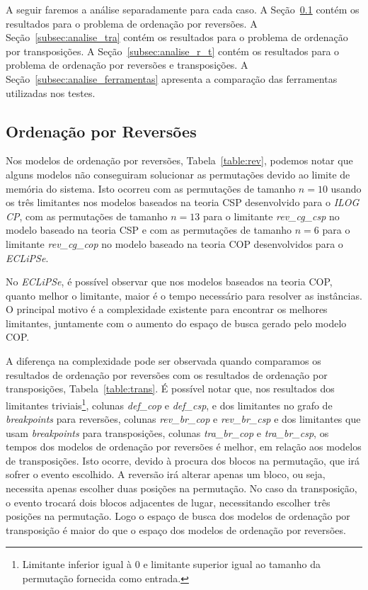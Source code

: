 A seguir faremos a análise separadamente para cada caso. A
Seção~\ref{subsec:analise_rev} contém os resultados para o problema de
ordenação por reversões. A Seção~\ref{subsec:analise_tra} contém os
resultados para o problema de ordenação por transposições. A
Seção~\ref{subsec:analise_r_t} contém os resultados para o problema de
ordenação por reversões e transposições. A
Seção~\ref{subsec:analise_ferramentas} apresenta a comparação das
ferramentas utilizadas nos testes.

\subsection{Ordenação por Reversões}
\label{subsec:analise_rev}
Nos modelos de ordenação por reversões, Tabela~\ref{table:rev}, podemos
notar que alguns modelos não conseguiram solucionar as permutações
devido ao limite de memória do sistema. Isto ocorreu com as permutações
de tamanho $n = 10$ usando os três limitantes nos modelos baseados na
teoria CSP desenvolvido para o \textit{ILOG CP}, com as permutações de
tamanho $n = 13$ para o limitante \textit{rev\_cg\_csp} no modelo
baseado na teoria CSP e com as permutações de tamanho $n = 6$ para o
limitante \textit{rev\_cg\_cop} no modelo baseado na teoria COP
desenvolvidos para o \textit{ECLiPSe}.

No \textit{ECLiPSe}, é possível observar que nos modelos baseados na
teoria COP, quanto melhor o limitante, maior é o tempo necessário para
resolver as instâncias. O principal motivo é a complexidade existente
para encontrar os melhores limitantes, juntamente com o aumento do
espaço de busca gerado pelo modelo COP. 

A diferença na complexidade pode ser observada quando comparamos os
resultados de ordenação por reversões com os resultados de ordenação por
transposições, Tabela~\ref{table:trans}. É possível notar que, nos
resultados dos limitantes triviais\footnote{Limitante inferior igual à
$0$ e limitante superior igual ao tamanho da permutação fornecida como
entrada.}, colunas \textit{def\_cop} e \textit{def\_csp}, e dos
limitantes no grafo de \textit{breakpoints} para reversões, colunas
\textit{rev\_br\_cop} e \textit{rev\_br\_csp} e dos limitantes que usam
\textit{breakpoints} para transposições, colunas \textit{tra\_br\_cop} e
\textit{tra\_br\_csp}, os tempos dos modelos de ordenação por reversões
é melhor, em relação aos modelos de transposições. Isto ocorre, devido à
procura dos blocos na permutação, que irá sofrer o evento escolhido. A
reversão irá alterar apenas um bloco, ou seja, necessita apenas escolher
duas posições na permutação. No caso da transposição, o evento trocará
dois blocos adjacentes de lugar, necessitando escolher três posições na
permutação. Logo o espaço de busca dos modelos de ordenação por
transposição é maior do que o espaço dos modelos de ordenação por
reversões.

